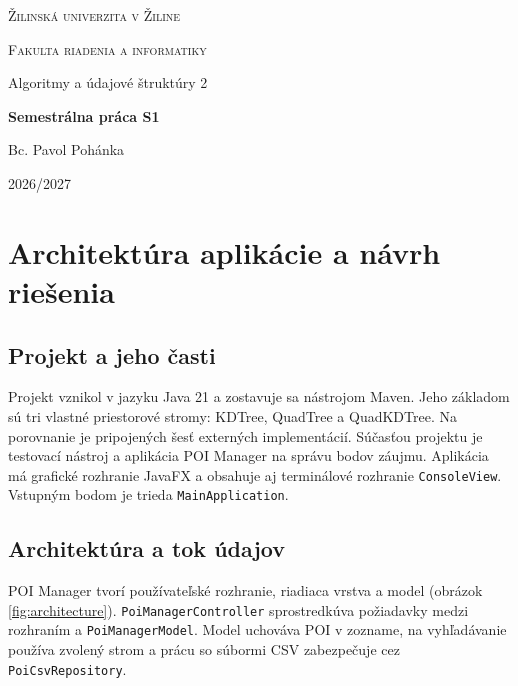 \documentclass[12pt,a4paper,oneside]{report}
\begin{document}

\begin{titlepage}
    \centering
    {\scshape\Large Žilinská univerzita v Žiline\par}
    \vspace{0.4cm}
    {\scshape\large Fakulta riadenia a informatiky\par}
    \vspace{1.2cm}
    {\large Algoritmy a údajové štruktúry 2\par}
    \vfill
    {\LARGE\bfseries Semestrálna práca S1\par}
    \vfill
    \noindent
    \begin{minipage}[t]{0.49\textwidth}
        \raggedright
        {\large Bc. Pavol Pohánka}
    \end{minipage}
    \begin{minipage}[t]{0.49\textwidth}
        \raggedleft
        {\large 2026/2027}
    \end{minipage}
\end{titlepage}

\tableofcontents
\clearpage
{}

\chapter{Architektúra aplikácie a návrh riešenia}

\section{Projekt a jeho časti}
Projekt vznikol v jazyku Java 21 a zostavuje sa nástrojom Maven.
Jeho základom sú tri vlastné priestorové stromy: KDTree, QuadTree
a QuadKDTree. Na porovnanie je pripojených šesť externých implementácií.
Súčasťou projektu je testovací nástroj a aplikácia POI Manager na
správu bodov záujmu. Aplikácia má grafické rozhranie JavaFX a obsahuje
aj terminálové rozhranie \texttt{ConsoleView}. Vstupným bodom je
trieda \texttt{MainApplication}.

\section{Architektúra a tok údajov}

POI Manager tvorí používateľské rozhranie, riadiaca vrstva a model
(obrázok \ref{fig:architecture}). \texttt{PoiManagerController}
sprostredkúva požiadavky medzi rozhraním a \texttt{PoiManagerModel}.
Model uchováva POI v zozname, na vyhľadávanie používa zvolený strom
a prácu so súbormi CSV zabezpečuje cez \texttt{PoiCsvRepository}.
\end{document}
